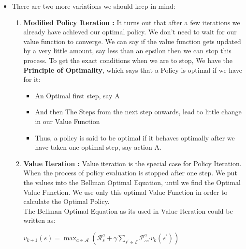 \documentclass{article}
\begin{document}
\begin{itemize}
  \item There are two more variations we should keep in mind:
  \begin{enumerate}
    \item \textbf{Modified Policy Iteration :}  It turns out that after a few iterations we already have achieved our optimal policy. We don’t need to wait for our value function to converge. We can say if the value function gets updated by a very little amount, say less than an epsilon then we can stop this process. To get the exact conditions when we are to stop, We have the \textbf{Principle of Optimality}, which says that a Policy is optimal if we have for it:
    \begin{itemize}
      \item  An Optimal first step, say A
      \item And then The Steps from the next step onwards, lead to little change in our Value Function
      \item Thus, a policy is said to be optimal if it behaves optimally after we have taken one optimal step, say action A.
    \end{itemize}
    \item \textbf{Value Iteration :} Value iteration is the special case for Policy Iteration. When the process of policy evaluation is stopped after one step. We put the values into the Bellman Optimal Equation, until we find the Optimal Value Function. We use only this optimal Value Function in order to calculate the Optimal Policy. \\
    The Bellman Optimal Equation as its used in Value Iteration could be written as:
    \begin{center}
      \( v_{k+1}(s)=\max _{a \in \mathcal{A}}\left(\mathcal{R}_{s}^{a}+\gamma \sum_{s^{\prime} \in \mathcal{S}} \mathcal{P}_{s s^{\prime}}^{a} v_{k}\left(s^{\prime}\right)\right) \)
    \end{center}
  \end{enumerate}
\end{itemize}
\end{document}
